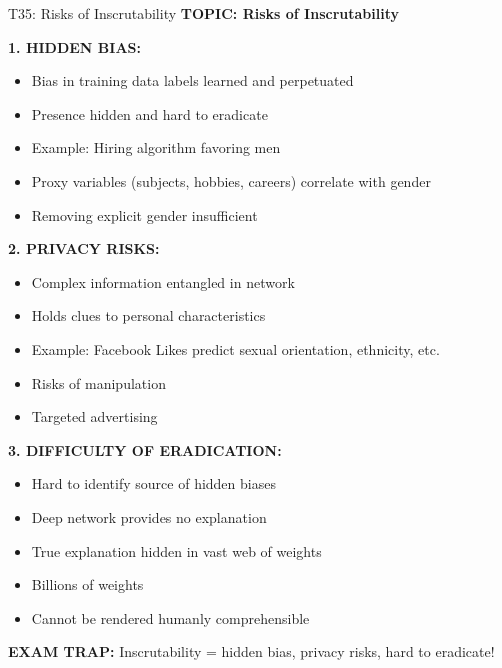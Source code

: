 \documentclass[8pt]{beamer}
\begin{document}
	\begin{frame}{T35: Risks of Inscrutability}
		\fontsize{6.5}{7.5}\selectfont
		\textbf{TOPIC: Risks of Inscrutability}
		
		\vspace{0.1cm}
		\textbf{1. HIDDEN BIAS:}
		\begin{itemize}
			\item Bias in training data labels learned and perpetuated
			\item Presence hidden and hard to eradicate
			\item Example: Hiring algorithm favoring men
			\item Proxy variables (subjects, hobbies, careers) correlate with gender
			\item Removing explicit gender insufficient
		\end{itemize}
		
		\vspace{0.1cm}
		\textbf{2. PRIVACY RISKS:}
		\begin{itemize}
			\item Complex information entangled in network
			\item Holds clues to personal characteristics
			\item Example: Facebook Likes predict sexual orientation, ethnicity, etc.
			\item Risks of manipulation
			\item Targeted advertising
		\end{itemize}
		
		\vspace{0.1cm}
		\textbf{3. DIFFICULTY OF ERADICATION:}
		\begin{itemize}
			\item Hard to identify source of hidden biases
			\item Deep network provides no explanation
			\item True explanation hidden in vast web of weights
			\item Billions of weights
			\item Cannot be rendered humanly comprehensible
		\end{itemize}
		
		\textcolor{myred}{\textbf{EXAM TRAP:}} Inscrutability = \textcolor{myblue}{hidden bias, privacy risks, hard to eradicate}!
	\end{frame}
	
\end{document}
